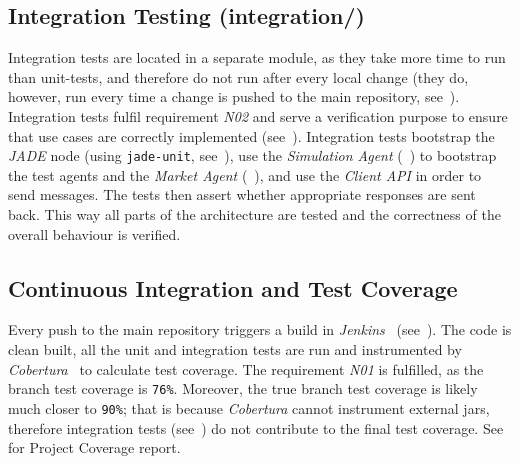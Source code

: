 \subsection{Integration Testing (integration/)}
\label{Chapters/Implementation/Integration-Testing}
Integration tests are located in a separate module, as they take more time to run than unit-tests, and therefore do not run after every local change (they do, however, run every time a change is pushed to the main repository, see~). Integration tests fulfil requirement \textit{N02} and serve a verification purpose to ensure that use cases are correctly implemented (see~). Integration tests bootstrap the \textit{JADE} node (using \texttt{jade-unit}, see~), use the \textit{Simulation Agent} (~) to bootstrap the test agents and the \textit{Market Agent} (~), and use the \textit{Client API} in order to send messages. The tests then assert whether appropriate responses are sent back. This way all parts of the architecture are tested and the correctness of the overall behaviour is verified.

\subsection{Continuous Integration and Test Coverage}
\label{Chapters/Implementation/Continuous-Integration}
Every push to the main repository triggers a build in \textit{Jenkins}~\cite{Jenkins} (see~). The code is clean built, all the unit and integration tests are run and instrumented by \textit{Cobertura}~\cite{Cobertura} to calculate test coverage. The requirement \textit{N01} is fulfilled, as the branch test coverage is \texttt{76\%}. Moreover, the true branch test coverage is likely much closer to \texttt{90\%}; that is because \textit{Cobertura} cannot instrument external jars, therefore integration tests (see~) do not contribute to the final test coverage. See  for Project Coverage report.
